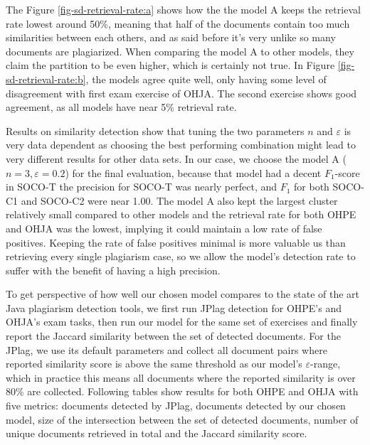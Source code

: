 \noindent
The Figure \ref{fig-sd-retrieval-rate:a} shows how the the model A keeps the retrieval rate lowest around 50\%, meaning that half of the documents contain too much similarities between each others, and as said before it's very unlike so many documents are plagiarized. When comparing the model A to other models, they claim the partition to be even higher, which is certainly not true. In Figure \ref{fig-sd-retrieval-rate:b}, the models agree quite well, only having some level of disagreement with first exam exercise of OHJA. The second exercise shows good agreement, as all models have near 5\% retrieval rate.

Results on similarity detection show that tuning the two parameters $n$ and $\varepsilon$ is very data dependent as choosing the best performing combination might lead to very different results for other data sets. In our case, we choose the model A ($n=3, \varepsilon=0.2$) for the final evaluation, because that model had a decent $F_1$-score in SOCO-T the precision for SOCO-T was nearly perfect, and $F_1$ for both SOCO-C1 and SOCO-C2 were near 1.00. The model A also kept the largest cluster relatively small compared to other models and the retrieval rate for both OHPE and OHJA was the lowest, implying it could maintain a low rate of false positives. Keeping the rate of false positives minimal is more valuable us than retrieving every single plagiarism case, so we allow the model's detection rate to suffer with the benefit of having a high precision.  

To get perspective of how well our chosen model compares to the state of the art Java plagiarism detection tools, we first run JPlag detection for OHPE's and OHJA's exam tasks, then run our model for the same set of exercises and finally report the Jaccard similarity between the set of detected documents. For the JPlag, we use its default parameters and collect all document pairs where reported similarity score is above the same threshold as our model's $\varepsilon$-range, which in practice this means all documents where the reported similarity is over 80\% are collected. Following tables show results for both OHPE and OHJA with five metrics: documents detected by JPlag, documents detected by our chosen model, size of the intersection between the set of detected documents, number of unique documents retrieved in total and the Jaccard similarity score.

